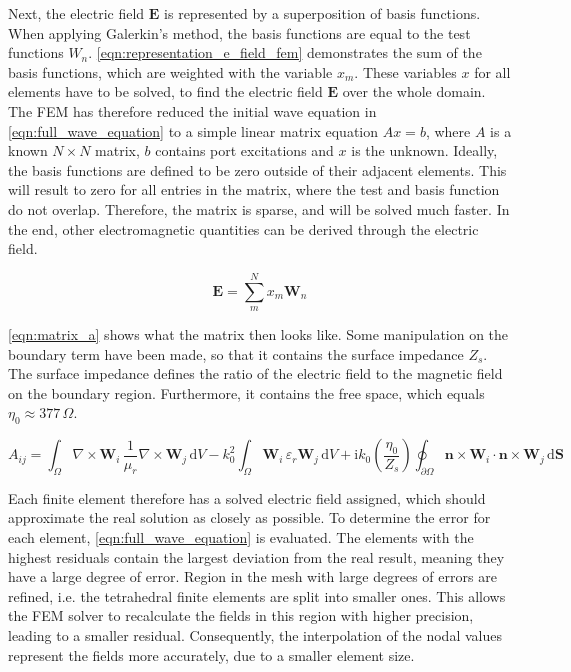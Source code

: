 Next, the electric field $\mathbf{E}$ is represented by a superposition of basis functions. When applying Galerkin's method, the basis functions are equal to the test functions $W_n$. \autoref{eqn:representation_e_field_fem} demonstrates the sum of the basis functions, which are weighted with the variable $x_m$. These variables $x$ for all elements have to be solved, to find the electric field $\mathbf{E}$ over the whole domain. The FEM has therefore reduced the initial wave equation in \autoref{eqn:full_wave_equation} to a simple linear matrix equation $Ax=b$, where $A$ is a known $N\times N$ matrix, $b$ contains port excitations and $x$ is the unknown. Ideally, the basis functions are defined to be zero outside of their adjacent elements. This will result to zero for all entries in the matrix, where the test and basis function do not overlap. Therefore, the matrix is sparse, and will be solved much faster. In the end, other electromagnetic quantities can be derived through the electric field.

\begin{equation}
    \mathbf{E}=\sum^N_mx_m\mathbf{W}_n
    \label{eqn:representation_e_field_fem}
\end{equation}

\autoref{eqn:matrix_a} shows what the matrix then looks like. Some manipulation on the boundary term have been made, so that it contains the surface impedance $Z_s$. The surface impedance defines the ratio of the electric field to the magnetic field on the boundary region. Furthermore, it contains the free space, which equals $\eta_0 \approx 377\,\Omega$.

\begin{equation}
A_{ij} = \int_{\Omega} \nabla \times \mathbf{W}_i \, \frac{1}{\mu_r} \nabla \times \mathbf{W}_j \, \mathrm{d}V 
- k_0^2 \int_{\Omega} \mathbf{W}_i \, \varepsilon_r \mathbf{W}_j \, \mathrm{d}V 
+ \mathrm{i} k_0 \left(\frac{\eta_0}{Z_s}\right) \oint_{\partial\Omega} \mathbf{n} \times \mathbf{W}_i \cdot \mathbf{n} \times \mathbf{W}_j \, \mathrm{d}\mathbf{S}
\label{eqn:matrix_a}
\end{equation}

Each finite element therefore has a solved electric field assigned, which should approximate the real solution as closely as possible. To determine the error for each element, \autoref{eqn:full_wave_equation} is evaluated. The elements with the highest residuals contain the largest deviation from the real result, meaning they have a large degree of error. Region in the mesh with large degrees of errors are refined, i.e. the tetrahedral finite elements are split into smaller ones. This allows the FEM solver to recalculate the fields in this region with higher precision, leading to a smaller residual. Consequently, the interpolation of the nodal values represent the fields more accurately, due to a smaller element size.

